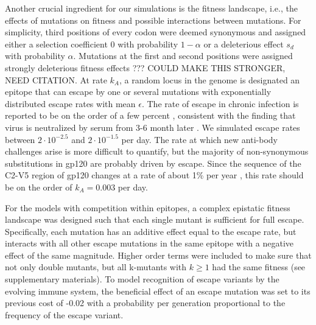 \documentclass[11pt]{article}
\begin{document}
Another crucial ingredient for our simulations is the fitness landscape,
i.e., the effects of mutations on fitness and possible interactions
between mutations. For simplicity, third positions of every codon were
deemed synonymous and assigned either a selection coefficient $0$ with
probability $1-\alpha$ or a deleterious effect $s_d$ with probability $\alpha$.
Mutations at the first and second positions were assigned strongly deleterious 
fitness effects ??? COULD MAKE THIS STRONGER, NEED CITATION. At 
rate $k_A$, a random locus in the genome is designated an epitope that can
escape by one or several mutations with exponentially distributed escape rates
with mean $\epsilon$. The rate of escape in chronic infection is
reported to be on the order of a few percent
\citep{Asquith:2006p28003,moore_limited_2009}, consistent with the
finding that virus is neutralized by serum from 3-6 month later
\citep{richman_rapid_2003}. We simulated escape rates between $2 \cdot
10^{-2.5}$ and $2 \cdot 10^{-1.5}$ per day. 
The rate at which new anti-body challenges arise is more difficult to
quantify, but the majority of non-synonymous substitutions in gp120 are
probably driven by escape. Since the sequence of the C2-V5 region of
gp120  changes at a rate of about 1\% per year
\citep{shankarappa_consistent_1999}, this rate should be on the order of
$k_A=0.003$ per day. 



For the models with competition within epitopes, a complex epistatic fitness
landscape was designed such that each single mutant is sufficient for full
escape. Specifically, each mutation has an additive effect equal to the
escape rate, but interacts with all other escape mutations in the same
epitope with a negative effect of the same magnitude. 
Higher order terms were included to make sure that not
only double mutants, but all k-mutants with $k \geq 1$ had the same fitness (see
supplementary materials). To model recognition of escape variants by the
evolving immune system, the beneficial effect of an escape mutation was set
to its previous cost of -0.02 with a probability per generation proportional to
the frequency of the escape variant.
\end{document}
